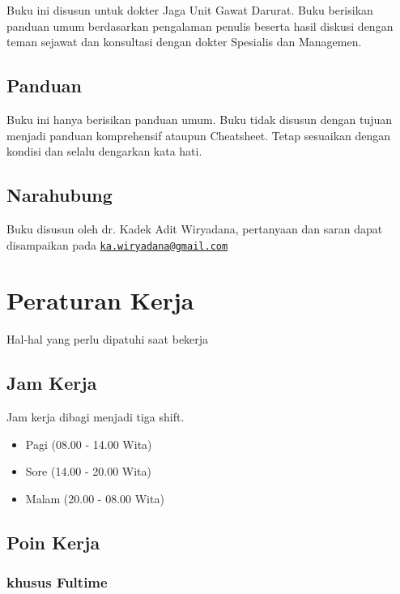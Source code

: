 \documentclass[
]{book}
\begin{document}
Buku ini disusun untuk dokter Jaga Unit Gawat Darurat. Buku berisikan panduan umum berdasarkan pengalaman penulis beserta hasil diskusi dengan teman sejawat dan konsultasi dengan dokter Spesialis dan Managemen.

\hypertarget{panduan}{%
\section{Panduan}\label{panduan}}

Buku ini hanya berisikan panduan umum. Buku tidak disusun dengan tujuan menjadi panduan komprehensif ataupun Cheatsheet. Tetap sesuaikan dengan kondisi dan selalu dengarkan kata hati.

\hypertarget{narahubung}{%
\section{Narahubung}\label{narahubung}}

Buku disusun oleh dr. Kadek Adit Wiryadana, pertanyaan dan saran dapat disampaikan pada \href{mailto:ka.wiryadana@gmail.com}{\nolinkurl{ka.wiryadana@gmail.com}}

\hypertarget{peraturan-kerja}{%
\chapter{Peraturan Kerja}\label{peraturan-kerja}}

Hal-hal yang perlu dipatuhi saat bekerja

\hypertarget{jam-kerja}{%
\section{Jam Kerja}\label{jam-kerja}}

Jam kerja dibagi menjadi tiga shift.

\begin{itemize}
\item
  Pagi (08.00 - 14.00 Wita)
\item
  Sore (14.00 - 20.00 Wita)
\item
  Malam (20.00 - 08.00 Wita)
\end{itemize}

\hypertarget{poin-kerja}{%
\section{Poin Kerja}\label{poin-kerja}}

\hypertarget{khusus-fultime}{%
\subsection*{khusus Fultime}\label{khusus-fultime}}
\end{document}
